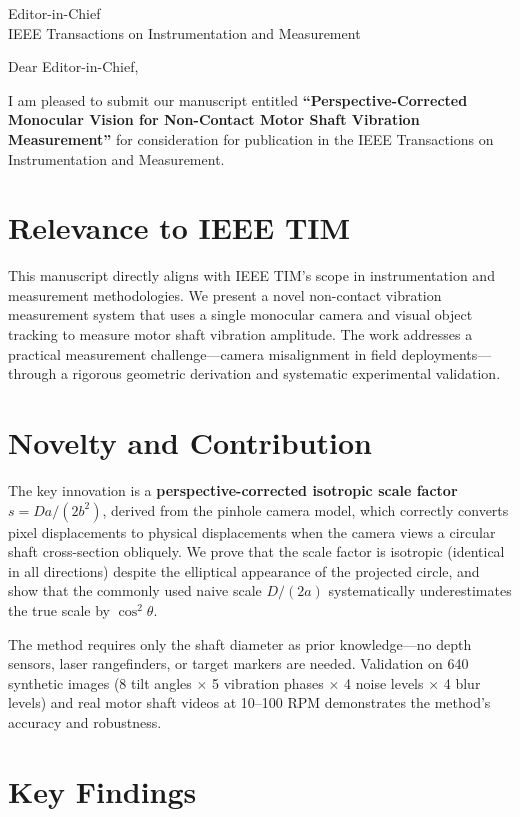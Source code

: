 \documentclass[12pt]{letter}
\begin{document}
\begin{letter}{Editor-in-Chief \\
IEEE Transactions on Instrumentation and Measurement}

\opening{Dear Editor-in-Chief,}

I am pleased to submit our manuscript entitled \textbf{``Perspective-Corrected
Monocular Vision for Non-Contact Motor Shaft Vibration Measurement''} for
consideration for publication in the IEEE Transactions on Instrumentation
and Measurement.

\section*{Relevance to IEEE TIM}

This manuscript directly aligns with IEEE TIM's scope in instrumentation and
measurement methodologies. We present a novel non-contact vibration measurement
system that uses a single monocular camera and visual object tracking to
measure motor shaft vibration amplitude. The work addresses a practical
measurement challenge---camera misalignment in field deployments---through a
rigorous geometric derivation and systematic experimental validation.

\section*{Novelty and Contribution}

The key innovation is a \textbf{perspective-corrected isotropic scale factor}
$s = D a / (2b^2)$, derived from the pinhole camera model, which correctly
converts pixel displacements to physical displacements when the camera views
a circular shaft cross-section obliquely. We prove that the scale factor is
isotropic (identical in all directions) despite the elliptical appearance of the
projected circle, and show that the commonly used naive scale $D/(2a)$
systematically underestimates the true scale by $\cos^2\theta$.

The method requires only the shaft diameter as prior knowledge---no depth
sensors, laser rangefinders, or target markers are needed. Validation on 640
synthetic images (8 tilt angles $\times$ 5 vibration phases $\times$ 4 noise
levels $\times$ 4 blur levels) and real motor shaft videos at 10--100 RPM
demonstrates the method's accuracy and robustness.

\section*{Key Findings}


\end{letter}
\end{document}
